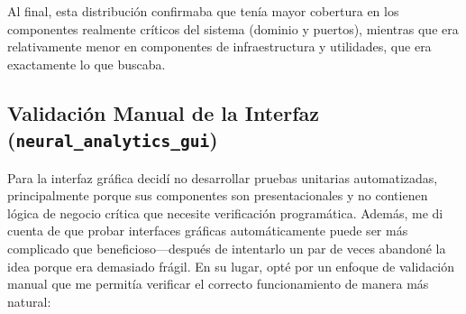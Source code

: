 Al final, esta distribución confirmaba que tenía mayor cobertura en los componentes realmente críticos del sistema (dominio y puertos), mientras que era relativamente menor en componentes de infraestructura y utilidades, que era exactamente lo que buscaba.

\newpage
\subsection{Validación Manual de la Interfaz (\texttt{neural\_analytics\_gui})}

Para la interfaz gráfica decidí no desarrollar pruebas unitarias automatizadas, principalmente porque sus componentes son presentacionales y no contienen lógica de negocio crítica que necesite verificación programática. Además, me di cuenta de que probar interfaces gráficas automáticamente puede ser más complicado que beneficioso—después de intentarlo un par de veces abandoné la idea porque era demasiado frágil. En su lugar, opté por un enfoque de validación manual que me permitía verificar el correcto funcionamiento de manera más natural:

\begin{table}[ht]
    \centering
    \small
    \caption{Resultados de la validación manual del módulo GUI}
    \label{tab:manual_tests_gui}
\end{table}

